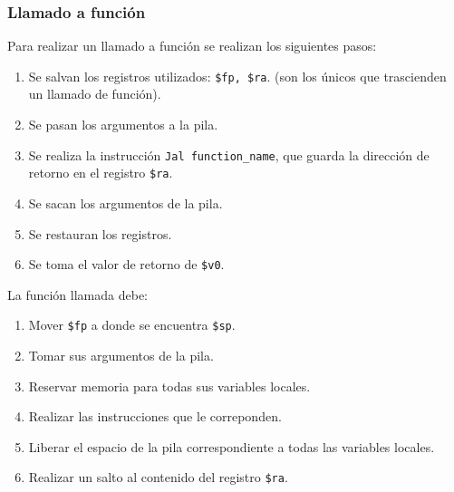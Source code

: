 \documentclass[a4paper,10pt,twocolumn]{article}
\begin{document}
\subsubsection{Llamado a función}
	Para realizar un llamado a función se realizan los siguientes pasos:
		\begin{enumerate}
			\item Se salvan los registros utilizados: \lstinline|$fp, $ra|. (son los únicos que trascienden un llamado de función).
			\item Se pasan los argumentos a la pila.
			\item Se realiza la instrucción \lstinline|Jal function_name|, que guarda la dirección de retorno en el registro \lstinline|$ra|.
			\item Se sacan los argumentos de la pila. 
			\item Se restauran los registros. 
			\item Se toma el valor de retorno de \lstinline|$v0|. 
		\end{enumerate}
	La función llamada debe:
		\begin{enumerate}
			\item Mover \lstinline|$fp| a donde se encuentra \lstinline|$sp|. 
			\item Tomar sus argumentos de la pila. 
			\item Reservar memoria para todas sus variables locales. 
			\item Realizar las instrucciones que le correponden. 
			\item Liberar el espacio de la pila correspondiente a todas las variables locales. 
			\item Realizar un salto al contenido del registro \lstinline|$ra|. 
		\end{enumerate}
\label{end}
\end{document}
